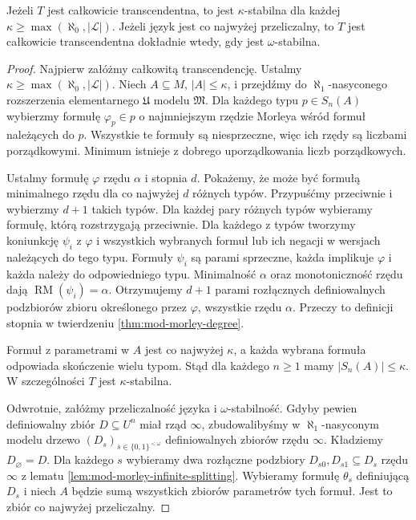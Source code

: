\begin{twierdzenie}
\label{thm:mod-total-transcendence-stability}
Jeżeli $T$ jest całkowicie transcendentna,
to jest $\kappa$-stabilna dla każdej
$\kappa\geq\max(\aleph_0,|\mathcal L|)$.
Jeżeli język jest co najwyżej przeliczalny,
to $T$ jest całkowicie transcendentna
dokładnie wtedy, gdy jest $\omega$-stabilna.
\end{twierdzenie}
\begin{proof}
Najpierw załóżmy całkowitą transcendencję.
Ustalmy $\kappa\geq\max(\aleph_0,|\mathcal L|)$.
Niech $A\subseteq M$, $|A|\leq\kappa$,
i przejdźmy do $\aleph_1$-nasyconego
rozszerzenia elementarnego $\mathfrak U$
modelu $\mathfrak M$.
Dla każdego typu $p\in S_n(A)$ wybierzmy
formułę $\varphi_p\in p$ o najmniejszym
rzędzie Morleya wśród formuł należących do $p$.
Wszystkie te formuły są niesprzeczne,
więc ich rzędy są liczbami porządkowymi.
Minimum istnieje z dobrego uporządkowania
liczb porządkowych.

Ustalmy formułę $\varphi$ rzędu $\alpha$
i stopnia $d$. Pokażemy, że może być
formułą minimalnego rzędu dla co najwyżej
$d$ różnych typów. Przypuśćmy przeciwnie
i wybierzmy $d+1$ takich typów.
Dla każdej pary różnych typów wybieramy
formułę, którą rozstrzygają przeciwnie.
Dla każdego z typów tworzymy koniunkcję
$\psi_i$ z $\varphi$ i wszystkich wybranych
formuł lub ich negacji w wersjach należących
do tego typu. Formuły $\psi_i$ są parami
sprzeczne, każda implikuje $\varphi$
i każda należy do odpowiedniego typu.
Minimalność $\alpha$ oraz monotoniczność
rzędu dają $\operatorname{RM}(\psi_i)=\alpha$.
Otrzymujemy $d+1$ parami rozłącznych
definiowalnych podzbiorów zbioru
określonego przez $\varphi$, wszystkie
rzędu $\alpha$. Przeczy to definicji stopnia
w twierdzeniu \ref{thm:mod-morley-degree}.

Formuł z parametrami w $A$ jest co najwyżej
$\kappa$, a każda wybrana formuła odpowiada
skończenie wielu typom. Stąd dla każdego
$n\geq1$ mamy $|S_n(A)|\leq\kappa$.
W szczególności $T$ jest $\kappa$-stabilna.

Odwrotnie, załóżmy przeliczalność języka
i $\omega$-stabilność.
Gdyby pewien definiowalny zbiór $D\subseteq U^n$
miał rząd $\infty$, zbudowalibyśmy w
$\aleph_1$-nasyconym modelu drzewo
$(D_s)_{s\in\{0,1\}^{<\omega}}$
definiowalnych zbiorów rzędu $\infty$.
Kładziemy $D_{\varnothing}=D$.
Dla każdego $s$ wybieramy dwa rozłączne
podzbiory $D_{s0},D_{s1}\subseteq D_s$
rzędu $\infty$ z lematu
\ref{lem:mod-morley-infinite-splitting}.
Wybieramy formułę $\theta_s$ definiującą $D_s$
i niech $A$ będzie sumą wszystkich zbiorów
parametrów tych formuł. Jest to zbiór
co najwyżej przeliczalny.


\end{proof}
